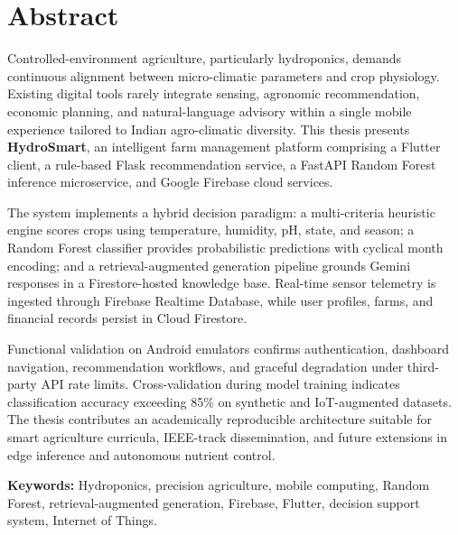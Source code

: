 \chapter*{Abstract}
\thispagestyle{empty}
\noindent Controlled-environment agriculture, particularly hydroponics, demands continuous alignment between micro-climatic parameters and crop physiology. Existing digital tools rarely integrate sensing, agronomic recommendation, economic planning, and natural-language advisory within a single mobile experience tailored to Indian agro-climatic diversity. This thesis presents \textbf{HydroSmart}, an intelligent farm management platform comprising a Flutter client, a rule-based Flask recommendation service, a FastAPI Random Forest inference microservice, and Google Firebase cloud services.

\vspace{0.3cm}
\noindent The system implements a hybrid decision paradigm: a multi-criteria heuristic engine scores crops using temperature, humidity, pH, state, and season; a Random Forest classifier provides probabilistic predictions with cyclical month encoding; and a retrieval-augmented generation pipeline grounds Gemini responses in a Firestore-hosted knowledge base. Real-time sensor telemetry is ingested through Firebase Realtime Database, while user profiles, farms, and financial records persist in Cloud Firestore.

\vspace{0.3cm}
\noindent Functional validation on Android emulators confirms authentication, dashboard navigation, recommendation workflows, and graceful degradation under third-party API rate limits. Cross-validation during model training indicates classification accuracy exceeding 85\% on synthetic and IoT-augmented datasets. The thesis contributes an academically reproducible architecture suitable for smart agriculture curricula, IEEE-track dissemination, and future extensions in edge inference and autonomous nutrient control.

\vspace{0.5cm}
\noindent\textbf{Keywords:} Hydroponics, precision agriculture, mobile computing, Random Forest, retrieval-augmented generation, Firebase, Flutter, decision support system, Internet of Things.

